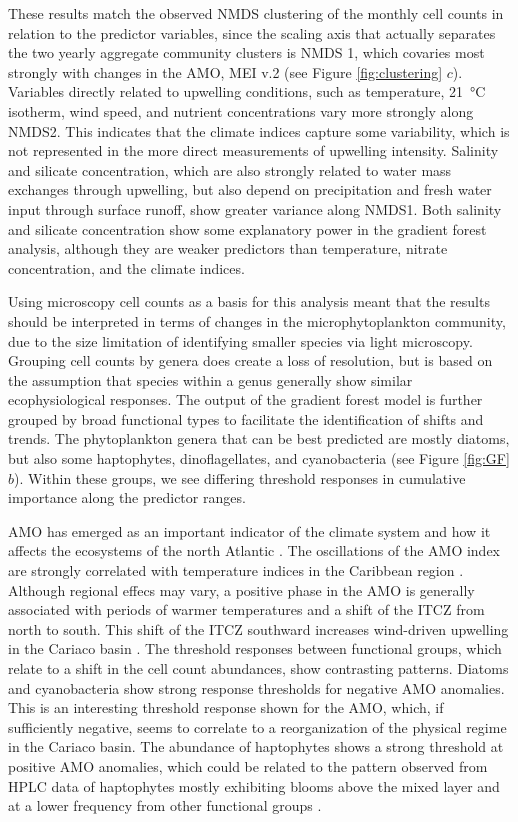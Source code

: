 \documentclass[draft]{agujournal2019}
\begin{document}
These results match the observed NMDS clustering of the monthly cell counts in relation to the predictor variables, since the scaling axis that actually separates the two yearly aggregate community clusters is NMDS 1, which covaries most strongly with changes in the AMO, MEI v.2 (see Figure \ref{fig:clustering} $c$). Variables directly related to upwelling conditions, such as temperature, \qty{21}{\celsius} isotherm, wind speed, and nutrient concentrations vary more strongly along NMDS2. This indicates that the climate indices capture some variability, which is not represented in the more direct measurements of upwelling intensity. Salinity and silicate concentration, which are also strongly related to water mass exchanges through upwelling, but also depend on precipitation and fresh water input through surface runoff, show greater variance along NMDS1. Both salinity and silicate concentration show some explanatory power in the gradient forest analysis, although they are weaker predictors than temperature, nitrate concentration, and the climate indices. 

Using microscopy cell counts as a basis for this analysis meant that the results should be interpreted in terms of changes in the microphytoplankton community, due to the size limitation of identifying smaller species via light microscopy. Grouping cell counts by genera does create a loss of resolution, but is based on the assumption that species within a genus generally show similar ecophysiological responses. The output of the gradient forest model is further grouped by broad functional types to facilitate the identification of shifts and trends. The phytoplankton genera that can be best predicted are mostly diatoms, but also some haptophytes, dinoflagellates, and cyanobacteria (see Figure \ref{fig:GF} $b$). Within these groups, we see differing threshold responses in cumulative importance along the predictor ranges.

AMO has emerged as an important indicator of the climate system and how it affects the ecosystems of the north Atlantic \cite{nye_ecosystem_2014}. The oscillations of the AMO index are strongly correlated with temperature indices in the Caribbean region \cite{stephenson_changes_2014}. Although regional effecs may vary, a positive phase in the AMO is generally associated with periods of warmer temperatures and a shift of the ITCZ from north to south. This shift of the ITCZ southward increases wind-driven upwelling in the Cariaco basin \cite{taylor_ecosystem_2012}. The threshold responses between functional groups, which relate to a shift in the cell count abundances, show contrasting patterns. Diatoms and cyanobacteria show strong response thresholds for negative AMO anomalies. This is an interesting threshold response shown for the AMO, which, if sufficiently negative, seems to correlate to a reorganization of the physical regime in the Cariaco basin. The abundance of haptophytes shows a strong threshold at positive AMO anomalies, which could be related to the pattern observed from HPLC data of haptophytes mostly exhibiting blooms above the mixed layer and at a lower frequency from other functional groups \cite{pinckney_phytoplankton_2015}.
\end{document}
